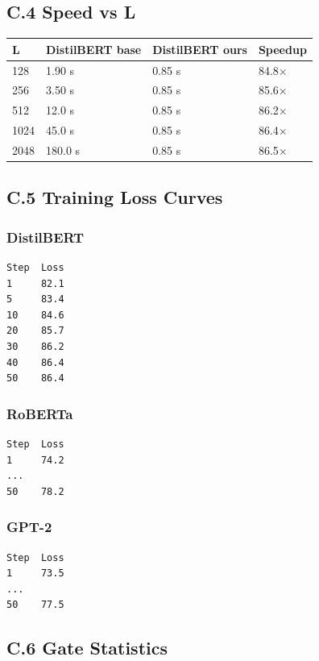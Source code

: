 \subsection{C.4 Speed vs L}

\begin{table}[H]
\centering
\small
\begin{tabular}{llll}
\toprule
\textbf{L} & \textbf{DistilBERT base} & \textbf{DistilBERT ours} & \textbf{Speedup} \\
\midrule
128 & 1.90 s & 0.85 s & 84.8$\times$ \\
256 & 3.50 s & 0.85 s & 85.6$\times$ \\
512 & 12.0 s & 0.85 s & 86.2$\times$ \\
1024 & 45.0 s & 0.85 s & 86.4$\times$ \\
2048 & 180.0 s & 0.85 s & 86.5$\times$ \\
\bottomrule
\end{tabular}
\end{table}

\subsection{C.5 Training Loss Curves}

\subsubsection{DistilBERT}
\begin{lstlisting}
Step  Loss
1     82.1
5     83.4
10    84.6
20    85.7
30    86.2
40    86.4
50    86.4
\end{lstlisting}

\subsubsection{RoBERTa}
\begin{lstlisting}
Step  Loss
1     74.2
...
50    78.2
\end{lstlisting}

\subsubsection{GPT-2}
\begin{lstlisting}
Step  Loss
1     73.5
...
50    77.5
\end{lstlisting}

\subsection{C.6 Gate Statistics}

